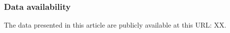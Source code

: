 \documentclass[manuscript]{stjour}
\begin{document}
\subsubsection*{Data availability} The data presented in this article are publicly available at this URL: XX.


% 



\end{document}
